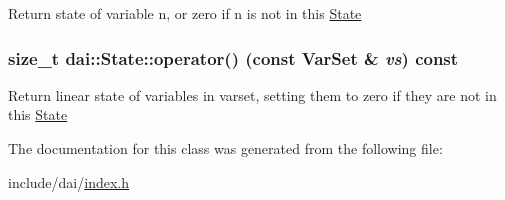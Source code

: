 Return state of variable n, or zero if n is not in this \hyperlink{classdai_1_1State}{State} \hypertarget{classdai_1_1State_475a14df77520317788c13a3386c3e16}{
\subsubsection[operator()]{\setlength{\rightskip}{0pt plus 5cm}size\_\-t dai::State::operator() (const {\bf VarSet} \& {\em vs}) const}}
\label{classdai_1_1State_475a14df77520317788c13a3386c3e16}


Return linear state of variables in varset, setting them to zero if they are not in this \hyperlink{classdai_1_1State}{State} 

The documentation for this class was generated from the following file:\begin{CompactItemize}
\item 
include/dai/\hyperlink{index_8h}{index.h}\end{CompactItemize}
